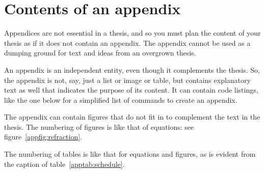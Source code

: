\documentclass[english, 12pt, a4paper, elec, utf8, a-2b, online]{aaltothesis}
\begin{document}
\clearpage

\thesisappendix

\section{Contents of an appendix}
\label{app:contents}

Appendices are not essential in a thesis, and so you must plan the content of 
your thesis as if it does not contain an appendix. The appendix cannot be used 
as a dumping ground for text and ideas from an overgrown thesis.

An appendix is an independent entity, even though it complements the thesis. 
So, the appendix is not, say, just a list or image or table, but contains 
explanatory text as well that indicates the purpose of its content. It can 
contain code listings, like the one below for a simplified list of commands to 
create an appendix.

The appendix can contain figures that do not fit in to complement the text in 
the thesis. The numbering of figures is like that of equations: see figure~\ref{appfig:refraction}.

The numbering of tables is like that for equations and figures, as is evident 
from the caption of table~\ref{apptab:schedule}.

\begin{table}[htb]
	\centering
	\caption{Caption for the table.}
	\label{apptab:schedule}
	\sffamily%
\end{table}
\end{document}
